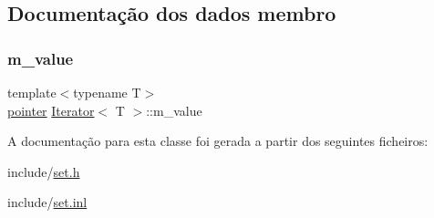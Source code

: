 \subsection{Documentação dos dados membro}
\mbox{\label{classIterator_af94f1036afce19abec73a51d52f2b817}} 
\subsubsection{\texorpdfstring{m\+\_\+value}{m\_value}}
{\footnotesize\ttfamily template$<$typename T$>$ \\
\hyperlink{classIterator_a37c4732ae0b73e9fdc3a585c01750d05}{pointer} \hyperlink{classIterator}{Iterator}$<$ T $>$\+::m\+\_\+value\hspace{0.3cm}{\ttfamily [private]}}



A documentação para esta classe foi gerada a partir dos seguintes ficheiros\+:\begin{DoxyCompactItemize}
\item 
include/\hyperlink{set_8h}{set.\+h}\item 
include/\hyperlink{set_8inl}{set.\+inl}\end{DoxyCompactItemize}
